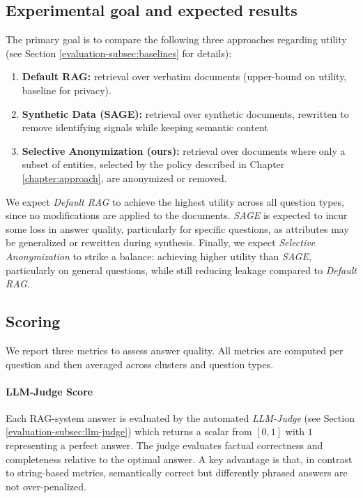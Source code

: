 \subsection{Experimental goal and expected results}
The primary goal is to compare the following three approaches regarding utility (see Section \ref{evaluation-subsec:baselines} for details):
\begin{enumerate}
\item \textbf{Default RAG:} retrieval over verbatim documents (upper-bound on utility, baseline for privacy).
\item \textbf{Synthetic Data (SAGE):} retrieval over synthetic documents, rewritten to remove identifying signals while keeping semantic content
\item \textbf{Selective Anonymization (ours):} retrieval over documents where only a subset of entities, selected by the policy described in Chapter \ref{chapter:approach}, are anonymized or removed.
\end{enumerate}

We expect \textit{Default RAG} to achieve the highest utility across all question types, since no modifications are applied to the documents. \textit{SAGE} is expected to incur some loss in answer quality, particularly for specific questions, as attributes may be generalized or rewritten during synthesis. Finally, we expect \textit{Selective Anonymization} to strike a balance: achieving higher utility than \textit{SAGE}, particularly on general questions, while still reducing leakage compared to \textit{Default RAG}.


\subsection{Scoring} 
We report three metrics to assess answer quality. All metrics are computed per question and then averaged across clusters and question types.
\paragraph{LLM-Judge Score} Each \ac{RAG}-system answer is evaluated by the automated \textit{LLM-Judge} (see Section \ref{evaluation-subsec:llm-judge}) which returns a scalar from $[0,1]$ with $1$ representing a perfect answer. The judge evaluates factual correctness and completeness relative to the optimal answer. A key advantage is that,  in contrast to string-based metrics,  semantically correct but differently phrased answers are not over-penalized.

